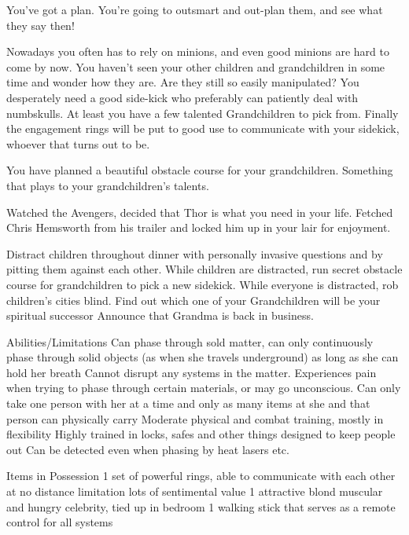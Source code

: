 \documentclass[char]{LRSguildcamp1}
\begin{document}
You've got a plan. You're  going to outsmart and out-plan them, and see what they say then! 

Nowadays you often has to rely on minions, and even good minions are hard to come by now. You haven't seen your other children and grandchildren in some time and wonder how they are. Are they still so easily manipulated? You desperately need a good side-kick who preferably can patiently deal with numbskulls.  At least you have a few talented Grandchildren to pick from. Finally the engagement rings will be put to good use to communicate with your sidekick, whoever that turns out to be. 

You have planned a beautiful obstacle course for your grandchildren. Something that plays to your grandchildren’s talents. 

Watched the Avengers, decided that Thor is what you need in your life. Fetched Chris Hemsworth from his trailer and locked him up in your lair for enjoyment.

\begin{itemz}[Goals]
	\item 
	Distract children throughout dinner with personally invasive questions and by pitting them against each other. 
	While children are distracted, run secret obstacle course for grandchildren to pick a new sidekick. 
	While everyone is distracted, rob children’s cities blind. 
	Find out which one of your Grandchildren will be your spiritual successor 
	Announce that Grandma is back in business. 
	
\end{itemz}

\begin{itemz}[Notes]
	\item 
	
	Abilities/Limitations 
	Can phase through sold matter, can only continuously phase through solid objects (as when she travels underground) as long as she can hold her breath 
	Cannot disrupt any systems in the matter. 
	Experiences pain when trying to phase through certain materials, or may go unconscious. 
	Can only take one person with her at a time and only as many items at she and that person can physically carry 
	Moderate physical and combat training, mostly in flexibility 
	Highly trained in locks, safes and other things designed to keep people out 
	Can be detected even when phasing by heat lasers etc. 
	
	Items in Possession
	1 set of powerful rings, able to communicate with each other at no distance limitation lots of sentimental value 
	1 attractive blond muscular and hungry celebrity, tied up in bedroom 
	1 walking stick that serves as a remote control for all systems 
	
\end{itemz}
\end{document}
